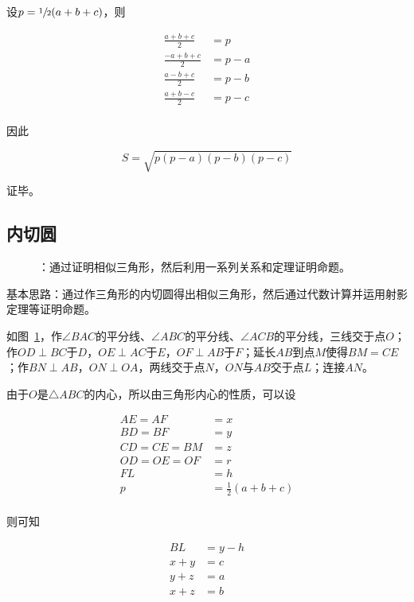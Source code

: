 设$p = \sfrac12(a + b + c)$，则

\begin{align*}
  \frac{a + b + c}2 &= p \\
  \frac{-a + b + c}2 &= p - a \\
  \frac{a - b + c}2 &= p - b \\
  \frac{a + b - c}2 &= p - c \\
\end{align*}

因此

\[ S = \sqrt{p(p - a)(p - b)(p - c)} \]

证毕。

\subsection{内切圆} \label{subsec:002A-circ}

\begin{figure}[htbp]
  \centering
  \caption{：通过证明相似三角形，然后利用一系列关系和定理证明命题。}
  \label{fig:002A-circ}
\end{figure}

基本思路：通过作三角形的内切圆得出相似三角形，然后通过代数计算并运用射影定理等证明命题。

如图~\ref{fig:002A-circ}，作$\angle BAC$的平分线、$\angle ABC$的平分线、$\angle ACB$的平分线，三线交于点$O$；作$OD \perp BC$于$D$，$OE \perp AC$于$E$，$OF \perp AB$于$F$；延长$AB$到点$M$使得$BM = CE$；作$BN \perp AB$，$ON \perp OA$，两线交于点$N$，$ON$与$AB$交于点$L$；连接$AN$。

由于$O$是$\triangle ABC$的内心，所以由三角形内心的性质，可以设

\begin{align*}
  AE = AF &= x \\
  BD = BF &= y \\
  CD = CE = BM &= z \\
  OD = OE = OF &= r \\
  FL &= h \\
  p &= \frac12(a + b + c) \\
\end{align*}

则可知

\begin{align*}
  BL &= y - h \\
  x + y &= c \\
  y + z &= a \\
  x + z &= b \\
\end{align*}

